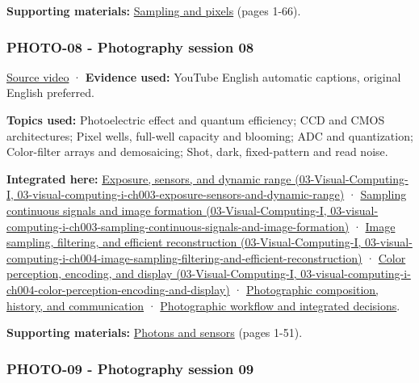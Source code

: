 \textbf{Supporting materials:} \href{https://drive.google.com/open?id=0B6w2XfPHEcZYc1lhZjNHU1NNVDQ}{Sampling and pixels} (pages 1-66).

\subsubsection{PHOTO-08 - Photography session 08}\label{04-visual-computing-ii-ch036-photo-08---photography-session-08}

\href{https://www.youtube.com/watch?v=VSdUlxgpKn4}{Source video} · \textbf{Evidence used:} YouTube English automatic captions, original English preferred.

\textbf{Topics used:} Photoelectric effect and quantum efficiency; CCD and CMOS architectures; Pixel wells, full-well capacity and blooming; ADC and quantization; Color-filter arrays and demosaicing; Shot, dark, fixed-pattern and read noise.

\textbf{Integrated here:} \href{../03-Visual-Computing-I/main.pdf\#nameddest=03-visual-computing-i-ch003-exposure-sensors-and-dynamic-range}{Exposure, sensors, and dynamic range (03-Visual-Computing-I, 03-visual-computing-i-ch003-exposure-sensors-and-dynamic-range)} · \href{../03-Visual-Computing-I/main.pdf\#nameddest=03-visual-computing-i-ch003-sampling-continuous-signals-and-image-formation}{Sampling continuous signals and image formation (03-Visual-Computing-I, 03-visual-computing-i-ch003-sampling-continuous-signals-and-image-formation)} · \href{../03-Visual-Computing-I/main.pdf\#nameddest=03-visual-computing-i-ch004-image-sampling-filtering-and-efficient-reconstruction}{Image sampling, filtering, and efficient reconstruction (03-Visual-Computing-I, 03-visual-computing-i-ch004-image-sampling-filtering-and-efficient-reconstruction)} · \href{../03-Visual-Computing-I/main.pdf\#nameddest=03-visual-computing-i-ch004-color-perception-encoding-and-display}{Color perception, encoding, and display (03-Visual-Computing-I, 03-visual-computing-i-ch004-color-perception-encoding-and-display)} · \hyperref[04-visual-computing-ii-ch034-photographic-composition-history-and-communication]{Photographic composition, history, and communication} · \hyperref[04-visual-computing-ii-ch034-photographic-workflow-and-integrated-decisions]{Photographic workflow and integrated decisions}.

\textbf{Supporting materials:} \href{https://drive.google.com/open?id=0B6w2XfPHEcZYell0Tkt2YjkwYWc}{Photons and sensors} (pages 1-51).

\subsubsection{PHOTO-09 - Photography session 09}\label{04-visual-computing-ii-ch036-photo-09---photography-session-09}

